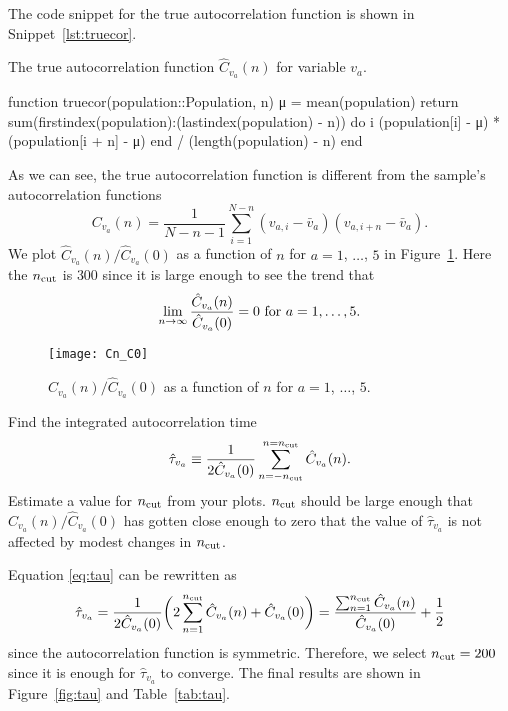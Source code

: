 \Answer{}
The code snippet for the true autocorrelation function is shown in Snippet~\ref{lst:truecor}.
%
\begin{algorithm}
    \caption{The true autocorrelation function $\hat{C}_{v_a}(n)$ for variable $v_a$.}
    \label{lst:truecor}
    \begin{juliacode}
        function truecor(population::Population, n)
            μ = mean(population)
            return sum(firstindex(population):(lastindex(population) - n)) do i
                (population[i] - μ) * (population[i + n] - μ)
            end / (length(population) - n)
        end
    \end{juliacode}
\end{algorithm}
%
As we can see, the true autocorrelation function is different from the sample's
autocorrelation functions
%
\begin{equation}
    C_{v_a}(n) = \frac{ 1 }{ N - n - 1 }
    \sum_{i=1}^{N-n} (v_{a,i} - \bar{v}_a) (v_{a,i + n} - \bar{v}_a).
\end{equation}
%
We plot $\hat{C}_{v_a}(n) / \hat{C}_{v_a}(0)$ as a function of $n$ for $a = 1$, $\ldots$,
$5$ in Figure~\ref{fig:truecor}.
Here the $n_\textnormal{cut}$ is $300$ since it is large enough to see the trend
that
%
\begin{equation}
    \lim_{n \rightarrow \infty} \frac{ \hat{C}_{v_a}(n) }{ \hat{C}_{v_a}(0) } = 0
    \textnormal{  for } a = 1, \ldots, 5.
\end{equation}

\begin{figure}[h]
    \centering
    \texttt{[image: Cn\_C0]}
    \caption{$\hat{C}_{v_a}(n) / \hat{C}_{v_a}(0)$ as a function of $n$ for
        $a = 1$, $\ldots$, $5$.}
    \label{fig:truecor}
\end{figure}

\Question{} Find the integrated autocorrelation time
%
\begin{equation}\label{eq:tau}
    \hat{\tau}_{v_a} \equiv \frac{ 1 }{ 2 \hat{C}_{v_a}(0) }
    \sum_{n=-n_\textnormal{cut}}^{n=n_\textnormal{cut}} \hat{C}_{v_a}(n).
\end{equation}
%
Estimate a value for $n_\textnormal{cut}$ from your plots.
$n_\textnormal{cut}$ should be large enough that $\hat{C}_{v_a}(n) / \hat{C}_{v_a}(0)$
has gotten close enough to zero that the value of $\hat{\tau}_{v_a}$
is not affected by modest changes in $n_\textnormal{cut}$.

\Answer{}
Equation \eqref{eq:tau} can be rewritten as
%
\begin{equation}
    \hat{\tau}_{v_a} = \frac{ 1 }{ 2 \hat{C}_{v_a}(0) }
    \biggl( 2\sum_{n=1}^{n_\textnormal{cut}} \hat{C}_{v_a}(n) + \hat{C}_{v_a}(0) \biggr)
    = \frac{ \sum_{n=1}^{n_\textnormal{cut}} \hat{C}_{v_a}(n) }{ \hat{C}_{v_a}(0) }
    + \frac{ 1 }{ 2 }
\end{equation}
%
since the autocorrelation function is symmetric.
Therefore, we select $n_\textnormal{cut} = 200$ since it is enough for $\hat{\tau}_{v_a}$
to converge.
The final results are shown in Figure~\ref{fig:tau} and Table~\ref{tab:tau}.

